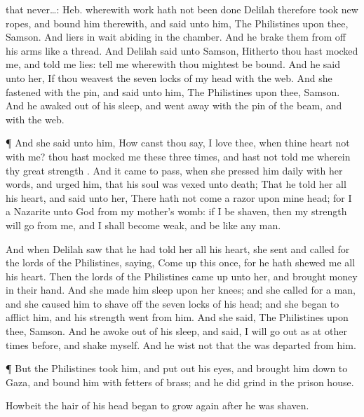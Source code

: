 {{that never…: Heb. wherewith work hath not been done}
Delilah therefore
took
new
ropes, and
bound him therewith, and
said unto him, The
Philistines
{} upon thee,
Samson. And
{} liers in
wait
abiding in the
chamber. And he
brake them from off his
arms like a
thread.
And
Delilah
said unto
Samson,
Hitherto thou hast
mocked me, and
told me
lies:
tell me wherewith thou mightest be
bound. And he
said unto her, If thou
weavest the
seven
locks of my
head with the
web.
And she
fastened
{} with the
pin, and
said unto him, The
Philistines
{} upon thee,
Samson. And he
awaked out of his
sleep, and went
away with the
pin of the
beam, and with the
web.
\par }{\PP {}¶ And she
said unto him,
How canst thou
say, I
love thee, when thine
heart
{} not with me? thou hast
mocked me these
three
times, and hast not
told me wherein thy
great
strength
{}.
And it came to pass, when she
pressed him
daily with her
words, and
urged him,
{} that his
soul was
vexed unto
death;
That he
told her all his
heart, and
said unto her, There hath not
come a
razor upon mine
head; for I
{} a
Nazarite unto
God from my
mother’s
womb: if I be
shaven, then my
strength will
go from me, and I shall become
weak, and be like any
{}
man.
\par }{\PP {}And when
Delilah
saw that he had
told her all his
heart, she
sent and
called for the
lords of the
Philistines,
saying, Come
up this
once, for he hath
shewed me all his
heart. Then the
lords of the
Philistines came
up unto her, and
brought
money in their
hand.
And she made him
sleep upon her
knees; and she
called for a
man, and she caused him to shave
off the
seven
locks of his
head; and she
began to
afflict him, and his
strength
went from him.
And she
said, The
Philistines
{} upon thee,
Samson. And he
awoke out of his
sleep, and
said, I will go
out as at other times
before, and
shake myself. And he
wist not that the
{} was
departed from him.
\par }{\PP {}¶ But the
Philistines
took him, and put
out his
eyes, and brought him
down to
Gaza, and
bound him with fetters of
brass; and he did
grind in the
prison
house.
\par }{\PP {}Howbeit the
hair of his
head
began to grow
again
after he was
shaven.
}
